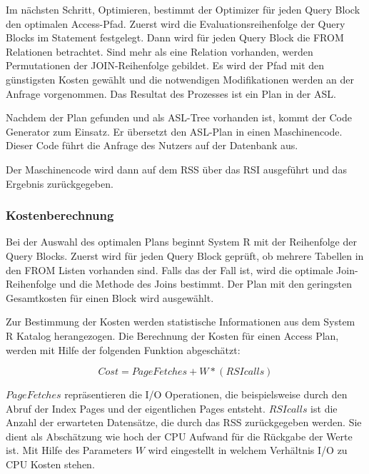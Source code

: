 Im nächsten Schritt, Optimieren, bestimmt der Optimizer für jeden Query Block den optimalen Access-Pfad. Zuerst wird die Evaluationsreihenfolge der Query Blocks im Statement festgelegt. Dann wird für jeden Query Block die FROM Relationen betrachtet. Sind mehr als eine Relation vorhanden, werden Permutationen der JOIN-Reihenfolge gebildet. Es wird der Pfad mit den günstigsten Kosten gewählt und die notwendigen Modifikationen werden an der Anfrage vorgenommen. Das Resultat des Prozesses ist ein Plan in der \ac{ASL}.

Nachdem der Plan gefunden und als \ac{ASL}-Tree vorhanden ist, kommt der Code Generator zum Einsatz. Er übersetzt den \ac{ASL}-Plan in einen  Maschinencode. Dieser Code führt die Anfrage des Nutzers auf der Datenbank aus. 

Der Maschinencode wird dann auf dem \ac{RSS} über das \ac{RSI} ausgeführt und das Ergebnis zurückgegeben.

\subsubsection{Kostenberechnung}
\label{sec:SystemRKostenberechnung}
Bei der Auswahl des optimalen Plans beginnt System R mit der Reihenfolge der Query Blocks. Zuerst wird für jeden Query Block geprüft, ob mehrere Tabellen in den FROM Listen vorhanden sind. Falls das der Fall ist, wird die optimale Join-Reihenfolge und die Methode des Joins bestimmt. Der Plan mit den geringsten Gesamtkosten für einen Block wird ausgewählt.

Zur Bestimmung der Kosten werden statistische Informationen aus dem System R Katalog herangezogen. Die Berechnung der Kosten für einen Access Plan, werden mit Hilfe der folgenden Funktion abgeschätzt:

$$Cost = Page Fetches + W * (RSI calls)$$


$Page Fetches$ repräsentieren die I/O Operationen, die beispielsweise durch den Abruf der Index Pages und der eigentlichen Pages entsteht. $RSI calls$ ist die Anzahl der erwarteten Datensätze, die durch das \ac{RSS} zurückgegeben werden. Sie dient als Abschätzung wie hoch der CPU Aufwand für die Rückgabe der Werte ist. Mit Hilfe des Parameters $W$ wird eingestellt in welchem Verhältnis I/O zu CPU Kosten stehen.




